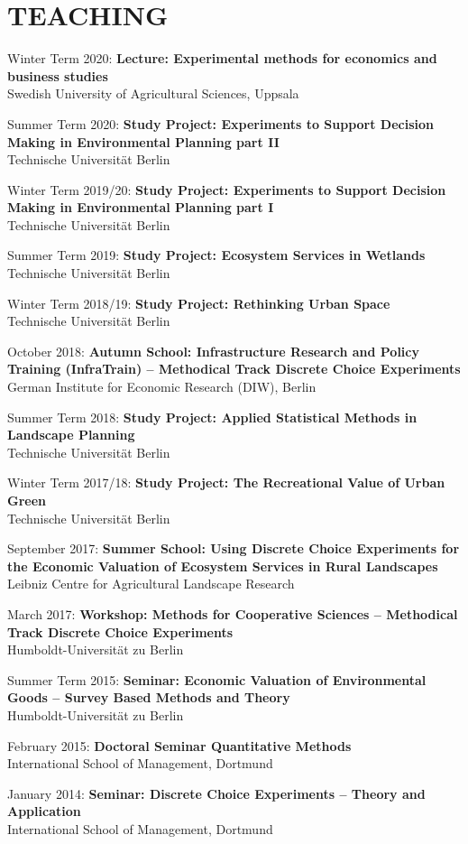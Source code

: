 \documentclass[paper=a4,fontsize=11pt]{scrartcl} %
\newcommand{\NewPart}[2]{\section*{\uppercase{#1} #2}}
\newcommand{\TalkEntry}[4]{
		\noindent #1, #2, #3 #4}
\newcommand{\CourseEntry}[3]{
		\noindent \item{#1: \textbf{#2} \\ #3}}
\begin{document}

\NewPart{Teaching}{}

\begin{etaremune}
\item[]
\vspace{-24pt}

\CourseEntry{Winter Term 2020}{Lecture: Experimental methods for economics and business studies}{Swedish University of Agricultural Sciences, Uppsala}

\CourseEntry{Summer Term 2020}{Study Project: Experiments to Support Decision Making in Environmental Planning part II}{Technische Universität Berlin}

\CourseEntry{Winter Term 2019/20}{Study Project: Experiments to Support Decision Making in Environmental Planning part I}{Technische Universität Berlin}

\CourseEntry{Summer Term 2019}{Study Project: Ecosystem Services in Wetlands}{Technische Universität Berlin}

\CourseEntry{Winter Term 2018/19}{Study Project: Rethinking Urban Space}{Technische Universität Berlin}

\CourseEntry{October 2018}{Autumn School: Infrastructure Research and Policy Training (InfraTrain) -- Methodical Track Discrete Choice Experiments}{ German Institute for Economic Research (DIW), Berlin}

\CourseEntry{Summer Term 2018}{Study Project: Applied Statistical Methods in Landscape Planning}{Technische Universität Berlin}

\CourseEntry{Winter Term 2017/18}{Study Project: The Recreational Value of Urban Green}{Technische Universität Berlin}

\CourseEntry{September 2017}{Summer School: Using Discrete Choice Experiments for the Economic Valuation of Ecosystem Services in Rural Landscapes}{Leibniz Centre for Agricultural Landscape Research}

\CourseEntry{March 2017}{Workshop: Methods for Cooperative Sciences -- Methodical Track Discrete Choice Experiments}{Humboldt-Universität zu Berlin}


\CourseEntry{Summer Term 2015}{Seminar: Economic Valuation of Environmental Goods – Survey Based Methods and Theory}{Humboldt-Universität zu Berlin}

\CourseEntry{February 2015}{Doctoral Seminar Quantitative Methods}{International School of Management, Dortmund}

\CourseEntry{January 2014}{Seminar: Discrete Choice Experiments – Theory and Application}{International School of Management, Dortmund}
\end{etaremune}
\end{document}
